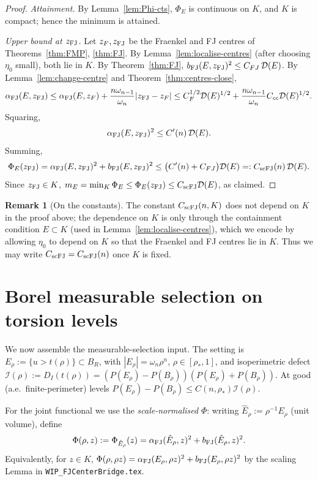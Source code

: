 \documentclass[11pt]{article}
\theoremstyle{definition}
\newtheorem{remark}[theorem]{Remark}
\newcommand{\rstar}{\rho_{*}}
\newcommand{\dD}{\mathcal D}
\newcommand{\alphaFJ}{\alpha_{\rm FJ}}
\newcommand{\bFJ}{b_{\rm FJ}}
\newcommand{\scFJ}{{\rm scFJ}}
\begin{document}
\begin{proof}
\emph{Attainment.}  By Lemma~\ref{lem:Phi-cts}, \(\Phi_E\) is
continuous on \(K\), and \(K\) is compact; hence the minimum is
attained.

\emph{Upper bound at \(z_{\rm FJ}\).}  Let \(z_F,z_{\rm FJ}\) be the
Fraenkel and FJ centres of Theorems~\ref{thm:FMP}, \ref{thm:FJ}.  By
Lemma~\ref{lem:localise-centres} (after choosing \(\eta_{0}\) small),
both lie in \(K\).  By Theorem~\ref{thm:FJ},
\(\bFJ(E,z_{\rm FJ})^{2}\le C_{FJ}\,\dD(E)\).  By
Lemma~\ref{lem:change-centre} and Theorem~\ref{thm:centres-close},
\[
   \alphaFJ(E,z_{\rm FJ})
   \le \alphaFJ(E,z_F)+\frac{n\omega_{n-1}}{\omega_n}
        |z_{\rm FJ}-z_F|
   \le C_F^{1/2}\dD(E)^{1/2}
      +\frac{n\omega_{n-1}}{\omega_n}C_{cc}\dD(E)^{1/2}.
\]
Squaring,
\[
   \alphaFJ(E,z_{\rm FJ})^{2}\le C'(n)\,\dD(E).
\]
Summing,
\[
   \Phi_E(z_{\rm FJ})
   =\alphaFJ(E,z_{\rm FJ})^{2}+\bFJ(E,z_{\rm FJ})^{2}
   \le \bigl(C'(n)+C_{FJ}\bigr)\dD(E)
   =: C_{\scFJ}(n)\,\dD(E).
\]
Since \(z_{\rm FJ}\in K\),
\(m_E=\min_{K}\Phi_E\le\Phi_E(z_{\rm FJ})\le C_{\scFJ}\dD(E)\), as
claimed.
\end{proof}

\begin{remark}[On the constants]\label{rem:constants}
The constant \(C_{\scFJ}(n,K)\) does not depend on \(K\) in the proof
above; the dependence on \(K\) is only through the containment
condition \(E\subset K\) (used in
Lemma~\ref{lem:localise-centres}), which we encode by allowing
\(\eta_0\) to depend on \(K\) so that the Fraenkel and FJ centres lie
in \(K\).  Thus we may write \(C_{\scFJ}=C_{\scFJ}(n)\) once \(K\) is
fixed.
\end{remark}

\section{Borel measurable selection on torsion levels}\label{sec:selection}

We now assemble the measurable-selection input.  The setting is
\(E_{\rho}:=\{u>t(\rho)\}\subset B_R\), with \(|E_\rho|=\omega_n\rho^n\),
\(\rho\in[\rstar,1]\), and isoperimetric defect
\(\mathcal I(\rho):=D_I(t(\rho))=(P(E_\rho)-P(B_\rho))(P(E_\rho)+P(B_\rho))\).
At good (a.e.\ finite-perimeter) levels
\(P(E_\rho)-P(B_\rho)\le C(n,\rstar)\mathcal I(\rho)\).

For the joint functional we use the
\emph{scale-normalised} \(\Phi\): writing \(\hat E_\rho:=\rho^{-1}E_\rho\)
(unit volume), define
\[
   \Phi(\rho,z):=\Phi_{\hat E_\rho}(z)
   = \alphaFJ(\hat E_\rho,z)^{2}+\bFJ(\hat E_\rho,z)^{2}.
\]
Equivalently, for \(z\in K\),
\(\Phi(\rho,\rho z)=\alphaFJ(E_\rho,\rho z)^{2}+\bFJ(E_\rho,\rho z)^{2}\)
by the scaling Lemma in \texttt{WIP\_FJCenterBridge.tex}.
\end{document}
